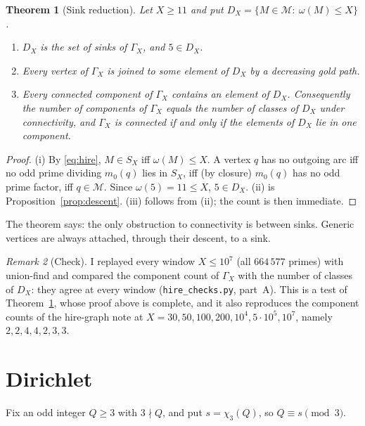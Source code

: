 \documentclass[11pt,a4paper]{article}
\newtheorem{theorem}{Theorem}[section]
\theoremstyle{remark}
\newtheorem{remark}[theorem]{Remark}
\newcommand{\chit}{\chi_3}
\newcommand{\pow}{\mathcal{M}}   %
\begin{document}
\begin{theorem}[Sink reduction]\label{thm:sinks}
Let \(X\ge 11\) and put \(D_X=\{M\in\pow:\ \omega(M)\le X\}\).
\begin{enumerate}
\item[(i)] \(D_X\) is the set of sinks of \(\Gamma_X\), and \(5\in D_X\).
\item[(ii)] Every vertex of \(\Gamma_X\) is joined to some element of \(D_X\) by a decreasing gold path.
\item[(iii)] Every connected component of \(\Gamma_X\) contains an element of \(D_X\).
Consequently the number of components of \(\Gamma_X\) equals the number of classes of \(D_X\) under connectivity, and \(\Gamma_X\) is connected if and only if the elements of \(D_X\) lie in one component.
\end{enumerate}
\end{theorem}
\begin{proof}
(i) By \eqref{eq:hire}, \(M\in S_X\) iff \(\omega(M)\le X\).
A vertex \(q\) has no outgoing arc iff no odd prime dividing \(m_0(q)\) lies in \(S_X\), iff (by closure) \(m_0(q)\) has no odd prime factor, iff \(q\in\pow\).
Since \(\omega(5)=11\le X\), \(5\in D_X\).
(ii) is Proposition~\ref{prop:descent}. (iii) follows from (ii); the count is then immediate.
\end{proof}

The theorem says: the only obstruction to connectivity is between sinks.
Generic vertices are always attached, through their descent, to a sink.

\begin{remark}[Check]\label{rem:check}
I replayed every window \(X\le 10^7\) (all \(664\,577\) primes) with union-find and compared the component count of \(\Gamma_X\) with the number of classes of \(D_X\): they agree at every window (\texttt{hire\_checks.py}, part~A).
This is a test of Theorem~\ref{thm:sinks}, whose proof above is complete, and it also reproduces the component counts of the hire-graph note at \(X=30,50,100,200,10^4,5\cdot10^5,10^7\), namely \(2,2,4,4,2,3,3\).
\end{remark}

\section{Dirichlet}\label{sec:dirichlet}

Fix an odd integer \(Q\ge 3\) with \(3\nmid Q\), and put \(s=\chit(Q)\), so \(Q\equiv s\pmod 3\).
\end{document}

